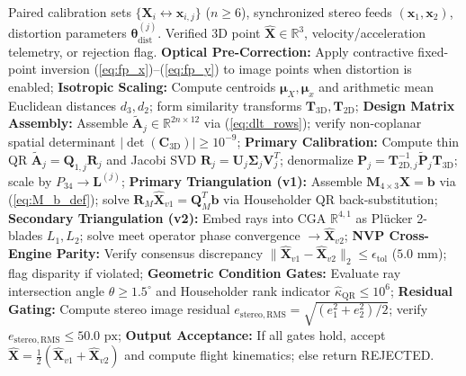 \documentclass[journal]{IEEEtran}
\begin{document}
\begin{table}[!t]
\caption{Algorithm 1: N-Version Programming Dual-Engine Stereo-Photogrammetric Reconstruction}
\label{alg:nvp_pipeline}
\centering
\begin{minipage}{0.96\textwidth}
\small
\begin{algorithmic}[1]
\REQUIRE Paired calibration sets $\{\mathbf{X}_i \leftrightarrow \mathbf{x}_{i,j}\}$ ($n \ge 6$), synchronized stereo feeds $(\mathbf{x}_1, \mathbf{x}_2)$, distortion parameters $\boldsymbol{\theta}_{\mathrm{dist}}^{(j)}$.
\ENSURE Verified 3D point $\hat{\mathbf{X}} \in \mathbb{R}^3$, velocity/acceleration telemetry, or rejection flag.
\STATE \textbf{Optical Pre-Correction:} Apply contractive fixed-point inversion (\ref{eq:fp_x})--(\ref{eq:fp_y}) to image points when distortion is enabled;
\STATE \textbf{Isotropic Scaling:} Compute centroids $\boldsymbol{\mu}_X, \boldsymbol{\mu}_x$ and arithmetic mean Euclidean distances $d_3, d_2$; form similarity transforms $\mathbf{T}_{3\mathrm{D}}, \mathbf{T}_{2\mathrm{D}}$;
\STATE \textbf{Design Matrix Assembly:} Assemble $\tilde{\mathbf{A}}_j \in \mathbb{R}^{2n \times 12}$ via (\ref{eq:dlt_rows}); verify non-coplanar spatial determinant $|\det(\mathbf{C}_{3\mathrm{D}})| \ge 10^{-9}$;
\STATE \textbf{Primary Calibration:} Compute thin QR $\tilde{\mathbf{A}}_j = \mathbf{Q}_{1,j} \mathbf{R}_j$ and Jacobi SVD $\mathbf{R}_j = \mathbf{U}_j \mathbf{\Sigma}_j \mathbf{V}_j^T$; denormalize $\mathbf{P}_j = \mathbf{T}_{2\mathrm{D},j}^{-1} \tilde{\mathbf{P}}_j \mathbf{T}_{3\mathrm{D}}$; scale by $P_{34} \to \mathbf{L}^{(j)}$;
\STATE \textbf{Primary Triangulation (v1):} Assemble $\mathbf{M}_{4 \times 3} \mathbf{X} = \mathbf{b}$ via (\ref{eq:M_b_def}); solve $\mathbf{R}_M \hat{\mathbf{X}}_{v1} = \mathbf{Q}_M^T \mathbf{b}$ via Householder QR back-substitution;
\STATE \textbf{Secondary Triangulation (v2):} Embed rays into CGA $\mathbb{R}^{4,1}$ as Plücker 2-blades $L_1, L_2$; solve meet operator phase convergence $\to \hat{\mathbf{X}}_{v2}$;
\STATE \textbf{NVP Cross-Engine Parity:} Verify consensus discrepancy $\|\hat{\mathbf{X}}_{v1} - \hat{\mathbf{X}}_{v2}\|_2 \le \epsilon_{\mathrm{tol}}$ ($5.0\text{ mm}$); flag disparity if violated;
\STATE \textbf{Geometric Condition Gates:} Evaluate ray intersection angle $\theta \ge 1.5^\circ$ and Householder rank indicator $\widehat{\kappa}_{\mathrm{QR}} \le 10^6$;
\STATE \textbf{Residual Gating:} Compute stereo image residual $e_{\mathrm{stereo,RMS}} = \sqrt{(e_1^2 + e_2^2)/2}$; verify $e_{\mathrm{stereo,RMS}} \le 50.0\text{ px}$;
\STATE \textbf{Output Acceptance:} If all gates hold, accept $\hat{\mathbf{X}} = \frac{1}{2}(\hat{\mathbf{X}}_{v1} + \hat{\mathbf{X}}_{v2})$ and compute flight kinematics; else return REJECTED.
\end{algorithmic}
\end{minipage}
\end{table}
\end{document}
